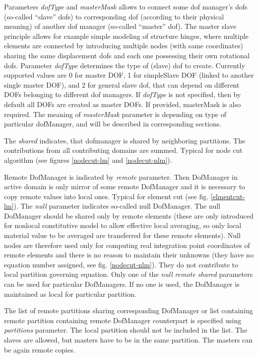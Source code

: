 \documentclass[a4paper]{article}
\newcommand{\param}[1]{{\em #1}}
\newcommand{\Pmode}[1]{{\sffamily #1}}
\begin{document}
Parameters \param{dofType} and \param{masterMask} allows to connect some dof manager's dofs
(so-called ``slave'' dofs)
to corresponding dof (according to their physical meaning) of another
dof manager (so-called ``master'' dof). The master slave principle
allows for example simple modeling of structure hinges, where multiple
elements are connected by introducing multiple nodes (with same
coordinates) sharing the same displacement dofs and each one possessing
their own rotational dofs.
Parameter
\param{dofType} determines the type of (slave) dof to
create. Currently supported values are 0 for master DOF, 1 for simpleSlave DOF (linked to another single master DOF), and 2 for general
slave dof, that can depend on different DOFs belonging to different
dof managers. 
If \param{dofType} is not specified, then by default all DOFs are
created as master DOFs. If provided, masterMask is also required. 
The meaning of \param{masterMask} parameter is
depending on type of particular dofManager, and will be described in
corresponding sections.

\Pmode{
The \param{shared} indicates, that dofmanager is shared by
neighboring partitions. The contributions from all contributing
domains are summed. Typical for node cut algorithm (see figures \ref{nodecut-lm}
and \ref{nodecut-nlm}).

Remote DofManager is indicated by \param{remote} parameter.
Then DofManager in active domain is only mirror of some remote
DofManager and it is necessary to copy remote values into local
ones. Typical for element cut (see fig. \ref{elmentcut-lm}).
The \param{null} parameter indicates so-called null DofManager. The
null DofManager should be shared only by remote elements (these are
only introduced for nonlocal constitutive model to allow effective
local averaging, so only local material value to be averaged are
transferred for these remote elements). Null nodes are therefore used
only for computing real integration point coordinates of remote
elements and there is no reason to maintain their unknowns (they have
no equation number assigned, see fig. \ref{nodecut-nlm}). They do not
contribute to local partition governing equation.
Only one of the \param{null} \param{remote} \param{shared} parameters can
be used for particular DofManagers. If no one is used, the DofManager
is maintained as local for particular partition.

The list of remote partitions sharing corresponding DofManager or list
containing  remote partition containing remote DofManager counterpart is
specified using \param{partitions} parameter. The local partition
should not be included in the list.
The slaves are allowed, but masters have to be in the same
partition. The masters can be again remote copies.
}
\end{document}
